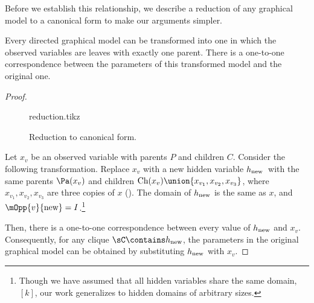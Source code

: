 Before we establish this relationship,
we describe a reduction of any graphical model to
  a canonical form to make our arguments simpler.

\begin{lemma}
  \label{lem:reduction}
Every directed graphical model can be transformed into one in which
  the observed variables are leaves with exactly one parent. 
There is a one-to-one correspondence between the parameters of this
  transformed model and the original one.
\end{lemma}
\begin{proof}
  \begin{figure}
    \centering
    {reduction.tikz}
    \caption{Reduction to canonical form.}
    \label{fig:reduction}
  \end{figure}

  \providecommand{\hp}{\ensuremath{h_\text{\rm new}}}

  Let $x_v$ be an observed variable with parents $P$ and children $C$.
  Consider the following transformation.
  Replace $x_v$ with a new hidden variable \hp\ with the same
  parents $\Pa(x_v)$ and children $\text{Ch}(x_v) \union \{x_{v_1}, x_{v_2}, x_{v_3}\}$,
  where $x_{v_1},x_{v_2},x_{v_3}$ are three copies of $x$
  (). 
  The domain of $\hp$ is the same as $x$,
    and $\mOpp{v}{\textrm{new}} = I$.\footnote{Though we have assumed that all hidden variables share the
      same domain, $[k]$, our work generalizes to hidden domains of
      arbitrary sizes.
      }

  Then, there is a one-to-one correspondence between every value of
  $\hp$ and $x_v$. Consequently, for any clique $\sC \contains \hp$, the
  parameters in the original graphical model can be obtained by
  substituting $\hp$ with $x_v$.
\end{proof}

